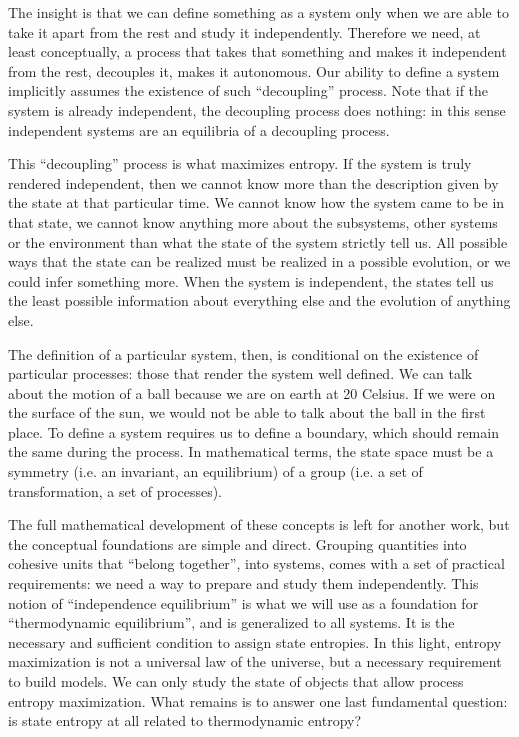 \documentclass[letterpaper,twocolumn]{article}
\begin{document}
The insight is that we can define something as a system only when we are able to take it apart from the rest and study it independently. Therefore we need, at least conceptually, a process that takes that something and makes it independent from the rest, decouples it, makes it autonomous. Our ability to define a system implicitly assumes the existence of such ``decoupling'' process. Note that if the system is already independent, the decoupling process does nothing: in this sense independent systems are an equilibria of a decoupling process.

This ``decoupling'' process is what maximizes entropy. If the system is truly rendered independent, then we cannot know more than the description given by the state at that particular time. We cannot know how the system came to be in that state, we cannot know anything more about the subsystems, other systems or the environment than what the state of the system strictly tell us. All possible ways that the state can be realized must be realized in a possible evolution, or we could infer something more.  When the system is independent, the states tell us the least possible information about everything else and the evolution of anything else.

The definition of a particular system, then, is conditional on the existence of particular processes: those that render the system well defined. We can talk about the motion of a ball because we are on earth at 20 Celsius. If we were on the surface of the sun, we would not be able to talk about the ball in the first place. To define a system requires us to define a boundary, which should remain the same during the process. In mathematical terms, the state space must be a symmetry (i.e. an invariant, an equilibrium) of a group (i.e. a set of transformation, a set of processes).

The full mathematical development of these concepts is left for another work, but the conceptual foundations are simple and direct. Grouping quantities into cohesive units that ``belong together'', into systems, comes with a set of practical requirements: we need a way to prepare and study them independently. This notion of ``independence equilibrium'' is what we will use as a foundation for ``thermodynamic equilibrium'', and is generalized to all systems. It is the necessary and sufficient condition to assign state entropies. In this light, entropy maximization is not a universal law of the universe, but a necessary requirement to build models. We can only study the state of objects that allow process entropy maximization. What remains is to answer one last fundamental question: is state entropy at all related to thermodynamic entropy?
\end{document}
